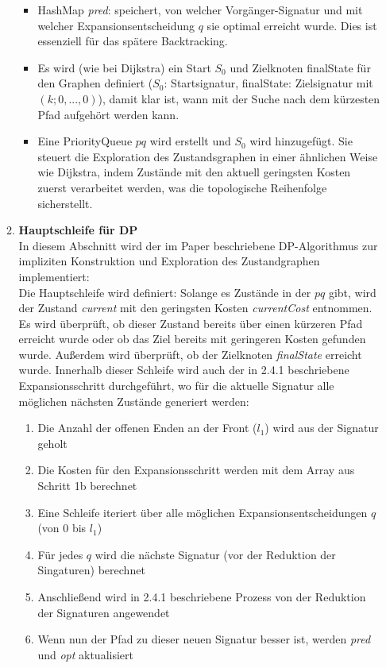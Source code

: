 \documentclass[a4paper,10pt,ngerman]{scrartcl}
\begin{document}
\begin{enumerate}
\begin{enumerate}
\begin{itemize}
      \item HashMap \textit{pred}: speichert, von welcher Vorgänger-Signatur und mit welcher Expansionsentscheidung $q$ sie optimal erreicht wurde. Dies ist essenziell für das spätere Backtracking. 
      \item Es wird (wie bei Dijkstra) ein Start $S_0$ und Zielknoten finalState für den Graphen definiert ($S_0$: Startsignatur, finalState: Zielsignatur mit $(k; 0, ..., 0)$), damit klar ist, wann mit der Suche nach dem kürzesten Pfad aufgehört werden kann. 
      \item Eine PriorityQueue $pq$ wird erstellt und $S_0$ wird hinzugefügt. Sie steuert die Exploration des Zustandsgraphen in einer ähnlichen Weise wie Dijkstra, indem Zustände mit den aktuell geringsten Kosten zuerst verarbeitet werden, was die topologische Reihenfolge sicherstellt. 
    \end{itemize}
  \item \textbf{Hauptschleife für DP}\\
  In diesem Abschnitt wird der im Paper beschriebene DP-Algorithmus zur impliziten Konstruktion und Exploration des Zustandgraphen implementiert: \\
  \newline
  Die Hauptschleife wird definiert: Solange es Zustände in der $pq$ gibt, wird der Zustand \textit{current} mit den geringsten Kosten \textit{currentCost} entnommen. Es wird überprüft, ob dieser Zustand bereits über einen kürzeren Pfad erreicht wurde oder ob das Ziel bereits mit geringeren Kosten gefunden wurde. Außerdem wird überprüft, ob der Zielknoten \textit{finalState} erreicht wurde. 
  \newline
  Innerhalb dieser Schleife wird auch der in 2.4.1 beschriebene Expansionsschritt durchgeführt, wo für die aktuelle Signatur alle möglichen nächsten Zustände generiert werden:
  \begin{enumerate}
    \item Die Anzahl der offenen Enden an der Front ($l_1$) wird aus der Signatur geholt 
    \item Die Kosten für den Expansionsschritt werden mit dem Array aus Schritt 1b berechnet 
    \item Eine Schleife iteriert über alle möglichen Expansionsentscheidungen $q$ (von 0 bis $l_1$)
    \item Für jedes $q$ wird die nächste Signatur (vor der Reduktion der Singaturen) berechnet  
    \item Anschließend wird in 2.4.1 beschriebene Prozess von der Reduktion der Signaturen angewendet 
    \item Wenn nun der Pfad zu dieser neuen Signatur besser ist, werden \textit{pred} und \textit{opt} aktualisiert  
  \end{enumerate}


\end{enumerate}
\end{enumerate}
\end{document}
